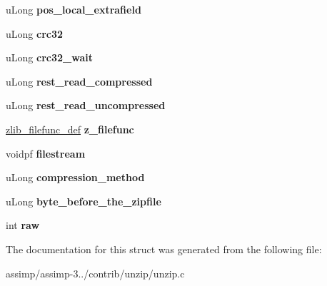\begin{DoxyCompactItemize}
\item 
\hypertarget{structfile__in__zip__read__info__s_aa07cf3d7d5d68e9537ffe99499d7db6f}{u\+Long {\bfseries pos\+\_\+local\+\_\+extrafield}}\label{structfile__in__zip__read__info__s_aa07cf3d7d5d68e9537ffe99499d7db6f}

\item 
\hypertarget{structfile__in__zip__read__info__s_a9d7e4dc6f312fb59bf8e60fb952f4d68}{u\+Long {\bfseries crc32}}\label{structfile__in__zip__read__info__s_a9d7e4dc6f312fb59bf8e60fb952f4d68}

\item 
\hypertarget{structfile__in__zip__read__info__s_a6120c521be40e8ba530249f0c766ab9d}{u\+Long {\bfseries crc32\+\_\+wait}}\label{structfile__in__zip__read__info__s_a6120c521be40e8ba530249f0c766ab9d}

\item 
\hypertarget{structfile__in__zip__read__info__s_a4c7b8e6502f7195feefd676dff0bb494}{u\+Long {\bfseries rest\+\_\+read\+\_\+compressed}}\label{structfile__in__zip__read__info__s_a4c7b8e6502f7195feefd676dff0bb494}

\item 
\hypertarget{structfile__in__zip__read__info__s_a8e3801645cfa5bfd147fd8d037fcf9a5}{u\+Long {\bfseries rest\+\_\+read\+\_\+uncompressed}}\label{structfile__in__zip__read__info__s_a8e3801645cfa5bfd147fd8d037fcf9a5}

\item 
\hypertarget{structfile__in__zip__read__info__s_a5eae7e8fffe8d7e9e7271ce2206283e7}{\hyperlink{structzlib__filefunc__def__s}{zlib\+\_\+filefunc\+\_\+def} {\bfseries z\+\_\+filefunc}}\label{structfile__in__zip__read__info__s_a5eae7e8fffe8d7e9e7271ce2206283e7}

\item 
\hypertarget{structfile__in__zip__read__info__s_ab0b66746406599abe4528b7b48961bba}{voidpf {\bfseries filestream}}\label{structfile__in__zip__read__info__s_ab0b66746406599abe4528b7b48961bba}

\item 
\hypertarget{structfile__in__zip__read__info__s_a86cbaa96568192cae9ab9cd606963fdb}{u\+Long {\bfseries compression\+\_\+method}}\label{structfile__in__zip__read__info__s_a86cbaa96568192cae9ab9cd606963fdb}

\item 
\hypertarget{structfile__in__zip__read__info__s_a52c8e657a1238a3b9fa87b4167d9b7a3}{u\+Long {\bfseries byte\+\_\+before\+\_\+the\+\_\+zipfile}}\label{structfile__in__zip__read__info__s_a52c8e657a1238a3b9fa87b4167d9b7a3}

\item 
\hypertarget{structfile__in__zip__read__info__s_aec0649000ce059ef1262b5a5be1641fe}{int {\bfseries raw}}\label{structfile__in__zip__read__info__s_aec0649000ce059ef1262b5a5be1641fe}

\end{DoxyCompactItemize}


The documentation for this struct was generated from the following file\+:\begin{DoxyCompactItemize}
\item 
assimp/assimp-\/3../contrib/unzip/unzip.\+c\end{DoxyCompactItemize}
